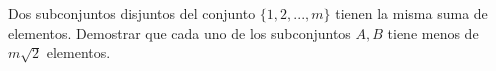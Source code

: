 Dos subconjuntos disjuntos del conjunto $\{1,2, ... ,m\}$ tienen la misma suma de elementos. Demostrar que cada uno de los subconjuntos $A,B$ tiene menos de $m\sqrt{2}$ elementos.
